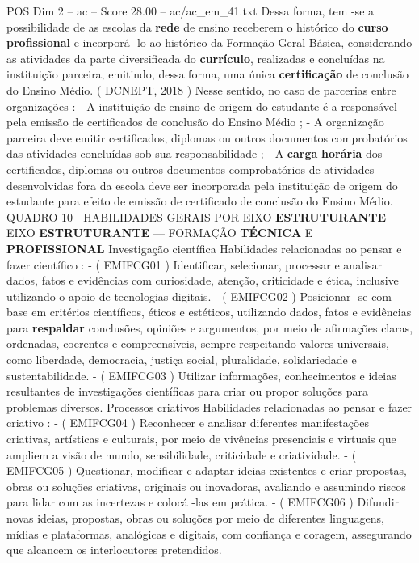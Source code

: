 \begin{textsample}{POS Dim 2 – ac – Score 28.00 – ac/ac\_em\_41.txt}
Dessa forma, tem -se a possibilidade de as escolas da \textbf{rede} de ensino receberem o histórico do \textbf{curso} \textbf{profissional} e incorporá -lo ao histórico da Formação Geral Básica, considerando as atividades da parte diversificada do \textbf{currículo}, realizadas e concluídas na instituição parceira, emitindo, dessa forma, uma única \textbf{certificação} de conclusão do Ensino Médio. ( DCNEPT, 2018 ) Nesse sentido, no caso de parcerias entre organizações : - A instituição de ensino de origem do estudante é a responsável pela emissão de certificados de conclusão do Ensino Médio ; - A organização parceira deve emitir certificados, diplomas ou outros documentos comprobatórios das atividades concluídas sob sua responsabilidade ; - A \textbf{carga} \textbf{horária} dos certificados, diplomas ou outros documentos comprobatórios de atividades desenvolvidas fora da escola deve ser incorporada pela instituição de origem do estudante para efeito de emissão de certificado de conclusão do Ensino Médio.
QUADRO 10 | HABILIDADES GERAIS POR EIXO \textbf{ESTRUTURANTE} EIXO \textbf{ESTRUTURANTE} — FORMAÇÃO \textbf{TÉCNICA} E \textbf{PROFISSIONAL} Investigação científica Habilidades relacionadas ao pensar e fazer científico : - ( EMIFCG01 ) Identificar, selecionar, processar e analisar dados, fatos e evidências com curiosidade, atenção, criticidade e ética, inclusive utilizando o apoio de tecnologias digitais. - ( EMIFCG02 ) Posicionar -se com base em critérios científicos, éticos e estéticos, utilizando dados, fatos e evidências para \textbf{respaldar} conclusões, opiniões e argumentos, por meio de afirmações claras, ordenadas, coerentes e compreensíveis, sempre respeitando valores universais, como liberdade, democracia, justiça social, pluralidade, solidariedade e sustentabilidade. - ( EMIFCG03 ) Utilizar informações, conhecimentos e ideias resultantes de investigações científicas para criar ou propor soluções para problemas diversos.
Processos criativos Habilidades relacionadas ao pensar e fazer criativo : - ( EMIFCG04 ) Reconhecer e analisar diferentes manifestações criativas, artísticas e culturais, por meio de vivências presenciais e virtuais que ampliem a visão de mundo, sensibilidade, criticidade e criatividade. - ( EMIFCG05 ) Questionar, modificar e adaptar ideias existentes e criar propostas, obras ou soluções criativas, originais ou inovadoras, avaliando e assumindo riscos para lidar com as incertezas e colocá -las em prática. - ( EMIFCG06 ) Difundir novas ideias, propostas, obras ou soluções por meio de diferentes linguagens, mídias e plataformas, analógicas e digitais, com confiança e coragem, assegurando que alcancem os interlocutores pretendidos.

\end{textsample}
